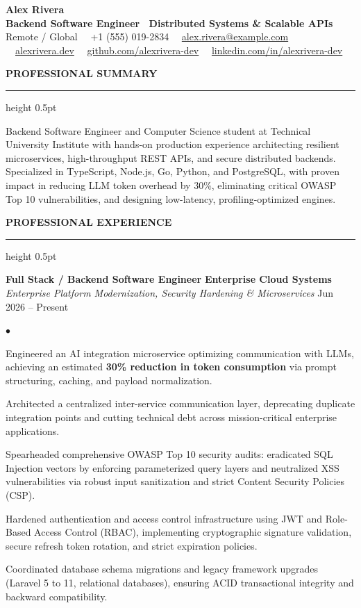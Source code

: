 \documentclass[10pt,letterpaper]{article}
\newcommand{\resumesection}[1]{%
  \vspace{2pt}%
  {\color{primary}\normalsize\bfseries\MakeUppercase{#1}}%
  \vspace{1pt}\hrule height 0.5pt\vspace{2pt}%
}
\renewenvironment{itemize}{%
  \begin{list}{\color{primary}$\bullet$}{%
    \setlength{\leftmargin}{1.1em}%
    \setlength{\itemsep}{0.5pt}%
    \setlength{\topsep}{1pt}%
    \setlength{\parsep}{0pt}%
    \setlength{\partopsep}{0pt}%
  }%
}{%
  \end{list}%
}
\begin{document}
\color{textdark}

\begin{center}
    {\LARGE \textbf{\color{primary} Alex Rivera}} \\ \vspace{1.5pt}
    {\large \textbf{Backend Software Engineer \textbar\ Distributed Systems \& Scalable APIs}} \\ \vspace{2pt}
    {\small
        Remote / Global \ \textbullet \
        +1 (555) 019-2834 \ \textbullet \
        \href{mailto:alex.rivera@example.com}{alex.rivera@example.com} \ \textbullet \
        \href{https://alexrivera.dev}{alexrivera.dev} \ \textbullet \
        \href{https://github.com/alexrivera-dev}{github.com/alexrivera-dev} \ \textbullet \
        \href{https://linkedin.com/in/alexrivera-dev}{linkedin.com/in/alexrivera-dev}
    }
\end{center}

\vspace{-6pt}

\resumesection{Professional Summary}
{\small Backend Software Engineer and Computer Science student at Technical University Institute with hands-on production experience architecting resilient microservices, high-throughput REST APIs, and secure distributed backends. Specialized in TypeScript, Node.js, Go, Python, and PostgreSQL, with proven impact in reducing LLM token overhead by 30\%, eliminating critical OWASP Top 10 vulnerabilities, and designing low-latency, profiling-optimized engines.}

\resumesection{Professional Experience}

\textbf{Full Stack / Backend Software Engineer} \hfill \textbf{Enterprise Cloud Systems} \\
\textit{Enterprise Platform Modernization, Security Hardening \& Microservices} \hfill Jun 2026 -- Present
\begin{itemize}
    \item Engineered an AI integration microservice optimizing communication with LLMs, achieving an estimated \textbf{30\% reduction in token consumption} via prompt structuring, caching, and payload normalization.
    \item Architected a centralized inter-service communication layer, deprecating duplicate integration points and cutting technical debt across mission-critical enterprise applications.
    \item Spearheaded comprehensive OWASP Top 10 security audits: eradicated SQL Injection vectors by enforcing parameterized query layers and neutralized XSS vulnerabilities via robust input sanitization and strict Content Security Policies (CSP).
    \item Hardened authentication and access control infrastructure using JWT and Role-Based Access Control (RBAC), implementing cryptographic signature validation, secure refresh token rotation, and strict expiration policies.
    \item Coordinated database schema migrations and legacy framework upgrades (Laravel 5 to 11, relational databases), ensuring ACID transactional integrity and backward compatibility.
\end{itemize}
\end{document}
